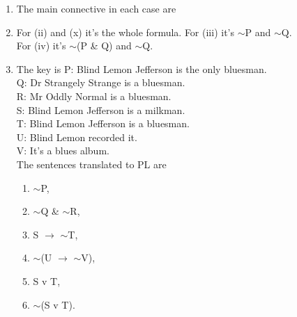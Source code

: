 \documentclass[a4paper,12pt]{article}
\newcommand{\ra}{$\rightarrow$ }
\newcommand{\s}{$\sim$}
\begin{document}
    \begin{enumerate}[label=\arabic*,leftmargin=*]
        \item The main connective in each case are
            \nopagebreak

        \item For (ii) and (x) it's the whole formula. For (iii) it's \s P and \s Q.\\
            For (iv) it's \s (P \& Q) and \s Q.

        \item The key is
            P: Blind Lemon Jefferson is the only bluesman.\\
            Q: Dr Strangely Strange is a bluesman.\\
            R: Mr Oddly Normal is a bluesman.\\
            S: Blind Lemon Jefferson is a milkman.\\
            T: Blind Lemon Jefferson is a bluesman.\\
            U: Blind Lemon recorded it.\\
            V: It's a blues album.\\
            The sentences translated to PL are

            \begin{enumerate}[label=(\roman*)]
                \item \s P,
                \item \s Q \& \s R,
                \item S \ra \s T,
                \item \s (U \ra \s V),
                \item S v T,
                \item \s (S v T).
            \end{enumerate}


\end{enumerate}
\end{document}
